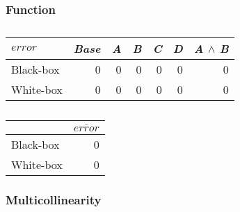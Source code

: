 \subsubsection*{Function}

\begin{table}[H]
    \begin{minipage}{.5\linewidth}
        \centering
        \begin{tabular}{lrrrrrr}    \toprule
        $error$     & \emph{Base} & \emph{A} & \emph{B} & \emph{C} & \emph{D} & \emph{A} $\land$ \emph{B}   \\ \midrule
        Black-box & 0 & 0 & 0 & 0 & 0 & 0      \\
        White-box & 0 & 0 & 0 & 0 & 0 & 0      \\ \bottomrule
        \end{tabular}
        \caption{}
    \end{minipage}%
    \hspace{7mm}
    \begin{minipage}{.3\linewidth}
        \centering
        \begin{tabular}{lr}
            \toprule
                      & $\overline{error}$   \\ \midrule
            Black-box & 0              \\
            White-box & 0              \\ \bottomrule
            \end{tabular}
            \caption{}
        \end{minipage}
    \end{table}
    
    \subsubsection*{Multicollinearity}

